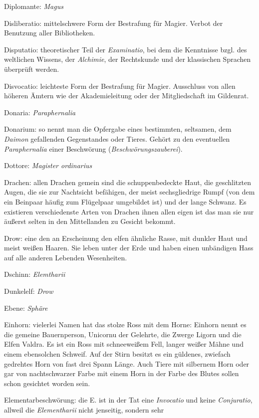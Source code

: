 \documentclass[a5paper,8pt]{book}
\begin{document}
\begin{small}
\begin{description}
 \item Diplomante: \textit{Magus}
 \item Disliberatio: mittelschwere Form der Bestrafung für Magier. Verbot der Benutzung aller Bibliotheken.
 \item Disputatio: theoretischer Teil der \textit{Examinatio}, bei dem die Kenntnisse bzgl. des weltlichen Wissens, der \textit{Alchimie}, der Rechtskunde und der klassischen Sprachen überprüft werden.
 \item Disvocatio: leichteste Form der Bestrafung für Magier. Ausschluss von allen höheren Ämtern wie der Akademieleitung oder der Mitgliedschaft im Gildenrat.
 \item Donaria: \textit{Paraphernalia}
 \item Donarium: so nennt man die Opfergabe eines bestimmten, seltsamen, dem \textit{Daimon} gefallenden Gegenstandes oder Tieres. Gehört zu den eventuellen
\textit{Paraphernalia} einer Beschwörung (\textit{Beschwörungs­zauberei}).
\item Dottore: \textit{Magister ordinarius}
 \item Drachen: allen Drachen gemein sind die schuppenbedeckte Haut, die geschlitzten Augen, die sie zur Nachtsicht befähigen, der meist sechsgliedrige Rumpf (von dem ein Beinpaar häufig zum Flügelpaar umgebildet ist) und der lange Schwanz. Es existieren verschiedenste Arten von Drachen ihnen allen eigen ist das man sie nur äußerst selten in den Mittellanden zu Gesicht bekommt. 
 \item Drow: eine den an Erscheinung den elfen ähnliche Rasse, mit dunkler Haut und meist weißen Haaren. Sie leben unter der Erde und haben einen unbändigen Hass auf alle anderen Lebenden Wesenheiten.
 \item Dschinn: \textit{Elemtharii}
 \item Dunkelelf: \textit{Drow}
 \item Ebene: \textit{Sphäre}
 \item Einhorn: vielerlei Namen hat das stolze Ross mit dem Horne: Einhorn nennt es die gemeine Bauernperson, Unicornu der Gelehrte, die Zwerge Ligorn und die Elfen Valdra. Es ist ein Ross mit schneeweißem Fell, langer weißer Mähne und einem ebensolchen Schweif. Auf der Stirn besitzt es ein güldenes, zwiefach gedrehtes Horn von fast drei Spann Länge. Auch Tiere mit silbernem Horn oder gar von nachtschwarzer Farbe mit einem Horn in der Farbe des Blutes sollen schon gesichtet worden sein.
 \item Elementarbeschwörung: die E. ist in der Tat eine \textit{Invocatio} und keine \textit{Conjuratio}, allweil die \textit{Elementharii} nicht jenseitig, sondern sehr

\end{description}
\end{small}
\end{document}

